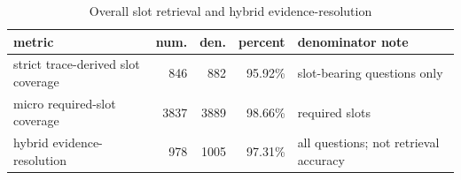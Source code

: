 \begin{table}[htbp]
\centering
\footnotesize
\setlength{\tabcolsep}{3pt}
\caption{Overall slot retrieval and hybrid evidence-resolution}
\label{tab:d5c-slot-retrieval-overall}
\begin{tabularx}{\linewidth}{>{\raggedright\arraybackslash}Xrrr>{\raggedright\arraybackslash}X}
\toprule
metric & num. & den. & percent & denominator note \\
\midrule
strict trace-derived slot coverage & 846 & 882 & 95.92\% & slot-bearing questions only \\
micro required-slot coverage & 3837 & 3889 & 98.66\% & required slots \\
hybrid evidence-resolution & 978 & 1005 & 97.31\% & all questions; not retrieval accuracy \\
\bottomrule
\end{tabularx}
\end{table}
